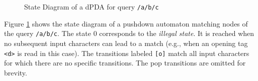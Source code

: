 \begin{figure}
\centering
{}
\caption{State Diagram of a dPDA for query \texttt{/a/b/c}}
\label{fig:exampleFSA}
\end{figure}

Figure \ref{fig:exampleFSA} shows the state diagram of a pushdown automaton
matching nodes of the query \verb;/a/b/c;. The state $0$ corresponds
to the \emph{illegal state}. It is reached when no subsequent input characters
can lead to a match (e.g., when an opening tag \verb;<d>; is read in this case).
The transitions labeled \verb;[o]; match all input characters for which there
are no specific transitions. The pop transitions are omitted for brevity.






